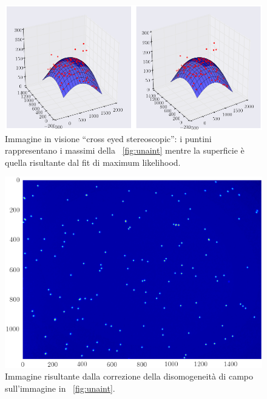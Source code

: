 \begin{figure}
 \centering
 \includegraphics[scale=0.45]{img/CAP3gauss.png}
 \caption{\small{Immagine in visione ``cross eyed stereoscopic'': i puntini rappresentano i massimi della \figurename~\ref{fig:unaint} mentre la superficie è quella risultante dal fit di maximum likelihood.}}
 \label{fig:gauss}
\end{figure}

\begin{figure}[p]
 \centering
 \includegraphics[scale=.64]{img/CAP3unaintcorr.png}
 \caption{\small{Immagine risultante dalla correzione della disomogeneità di campo sull'immagine in \figurename~\ref{fig:unaint}.}}
 \label{fig:unaintcorr}
\end{figure}

